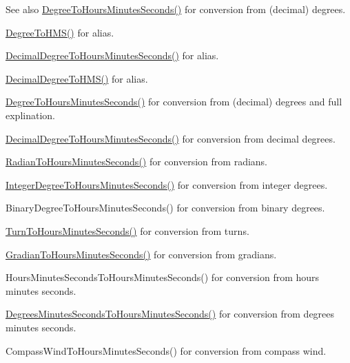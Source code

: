\begin{DoxySeeAlso}{See also}
\mbox{\hyperlink{group___e_g_x_math-_conversions-_angle_conversions-_degree_ga770b13da33b6f6c7bfa398cca7f24dbe}{Degree\+To\+Hours\+Minutes\+Seconds()}} for conversion from (decimal) degrees. 

\mbox{\hyperlink{group___e_g_x_math-_conversions-_angle_conversions-_degree_ga0bb223ca6e77b00439a6d910ab32d82e}{Degree\+To\+H\+M\+S()}} for alias. 

\mbox{\hyperlink{group___e_g_x_math-_conversions-_angle_conversions-_decimal_degree_gaa3f0b6c7c497882935487ad2d55a0f5a}{Decimal\+Degree\+To\+Hours\+Minutes\+Seconds()}} for alias. 

\mbox{\hyperlink{group___e_g_x_math-_conversions-_angle_conversions-_decimal_degree_ga981b48f16766590641360ca98dfa7b8c}{Decimal\+Degree\+To\+H\+M\+S()}} for alias. 

\mbox{\hyperlink{group___e_g_x_math-_conversions-_angle_conversions-_degree_ga770b13da33b6f6c7bfa398cca7f24dbe}{Degree\+To\+Hours\+Minutes\+Seconds()}} for conversion from (decimal) degrees and full explination. 

\mbox{\hyperlink{group___e_g_x_math-_conversions-_angle_conversions-_decimal_degree_gaa3f0b6c7c497882935487ad2d55a0f5a}{Decimal\+Degree\+To\+Hours\+Minutes\+Seconds()}} for conversion from decimal degrees. 

\mbox{\hyperlink{group___e_g_x_math-_conversions-_angle_conversions-_radian_ga3467598d89af2b8ff68af50b39bb19e2}{Radian\+To\+Hours\+Minutes\+Seconds()}} for conversion from radians. 

\mbox{\hyperlink{group___e_g_x_math-_conversions-_angle_conversions-_integer_degree_gaaac96728b305fd8ed024843f4e92fd08}{Integer\+Degree\+To\+Hours\+Minutes\+Seconds()}} for conversion from integer degrees. 

Binary\+Degree\+To\+Hours\+Minutes\+Seconds() for conversion from binary degrees. 

\mbox{\hyperlink{group___e_g_x_math-_conversions-_angle_conversions-_turn_ga0bc017b3314253352ddec728d3f6b76a}{Turn\+To\+Hours\+Minutes\+Seconds()}} for conversion from turns. 

\mbox{\hyperlink{group___e_g_x_math-_conversions-_angle_conversions-_gradian_gaf174cf5b716d5a490b3744ffe9ff3b97}{Gradian\+To\+Hours\+Minutes\+Seconds()}} for conversion from gradians. 

Hours\+Minutes\+Seconds\+To\+Hours\+Minutes\+Seconds() for conversion from hours minutes seconds. 

\mbox{\hyperlink{group___e_g_x_math-_conversions-_angle_conversions-_degrees_minutes_seconds_ga7fc14ecc37f95ec9228821c3a087e83b}{Degrees\+Minutes\+Seconds\+To\+Hours\+Minutes\+Seconds()}} for conversion from degrees minutes seconds. 

Compass\+Wind\+To\+Hours\+Minutes\+Seconds() for conversion from compass wind. 
\end{DoxySeeAlso}
\mbox{\label{group___e_g_x_math-_conversions-_angle_conversions-_degree_gaabd20f21be3c18ee423d0bc1a677c6f6}} 
